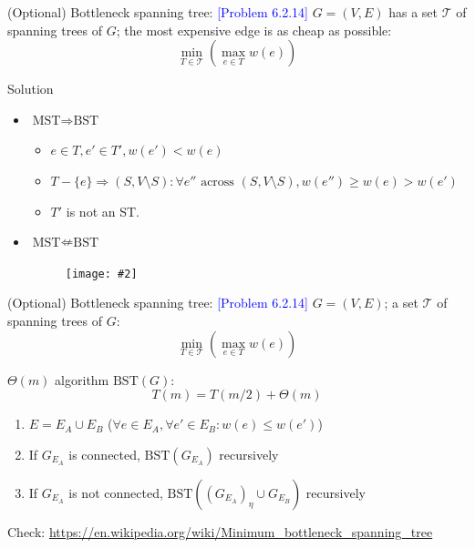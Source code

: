 \documentclass{beamer}
\newcommand{\set}[1]{\{ #1 \}}
\newcommand{\problemno}[1]{\textcolor{blue}{\scriptsize [Problem #1]}}
\newcommand{\fignocaption}[2]
{
  \begin{figure}[htp]
    \centering
      \texttt{[image: \#2]}
  \end{figure}
}
\begin{document}
\begin{frame}
  \begin{block}{(Optional) Bottleneck spanning tree: \problemno{6.2.14}}
  	$G = (V,E)$ has a set $\mathcal{T}$ of spanning trees of $G$; the most
  	expensive edge is as cheap as possible:
	\[
	  \min_{T \in \mathcal{T}} \left( \max_{e \in T} w(e) \right)
	\]
  \end{block}

  \begin{block}{Solution}
    \begin{itemize}
      \item $\textrm{MST} \Rightarrow \textrm{BST}$
        \begin{itemize}
          \item $e \in T, e' \in T', w(e') < w(e)$
          \item $T - \set{e} \Rightarrow (S, V \setminus S): \forall e''
          \textrm{ across } (S, V \setminus S), w(e'') \geq w(e) > w(e')$
          \item $T'$ is not an ST.
        \end{itemize}
      \item $\textrm{MST} \nLeftarrow \textrm{BST}$
        \fignocaption{width = 0.20\textwidth}
        	{fig/bottleneck-spanning-tree-example.pdf}
    \end{itemize}
  \end{block}
\end{frame}
\begin{frame}{}
  \begin{block}{(Optional) Bottleneck spanning tree: \problemno{6.2.14}}
  	$G = (V,E)$; a set $\mathcal{T}$ of spanning trees of $G$:
	\[
	  \min_{T \in \mathcal{T}} \left( \max_{e \in T} w(e) \right)
	\]
  \end{block}

  \begin{block}{$\Theta(m)$ algorithm $\textrm{BST}(G)$:}
    \[
      T(m) = T(m/2) + \Theta(m)
    \]
	\begin{enumerate}
	  \item $E = E_A \cup E_B$ ($\forall e \in E_A, \forall e' \in E_B: w(e) \leq
	  w(e')$)
	  \item If $G_{E_A}$ is connected, $\textrm{BST}(G_{E_A})$ recursively
	  \item If $G_{E_A}$ is not connected, $\textrm{BST}\left((G_{E_A})_{\eta} \cup
	  G_{E_B}\right)$ recursively
	\end{enumerate}
	Check: \url{https://en.wikipedia.org/wiki/Minimum_bottleneck_spanning_tree}
  \end{block}
\end{frame}
\end{document}
